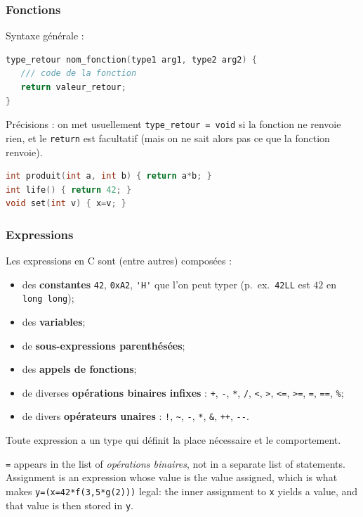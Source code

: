 \subsubsection{Fonctions}
Syntaxe générale :
\begin{lstlisting}[language=C]
type_retour nom_fonction(type1 arg1, type2 arg2) {
   /// code de la fonction
   return valeur_retour;
}
\end{lstlisting}
Précisions : on met usuellement \verb|type_retour = void| si la fonction ne
renvoie rien, et le \verb|return| est facultatif (mais on ne sait alors pas ce
que la fonction renvoie).

\begin{example}
  \begin{lstlisting}[language=C]
int produit(int a, int b) { return a*b; }
int life() { return 42; }
void set(int v) { x=v; }
  \end{lstlisting}
\end{example}

\subsubsection{Expressions}
Les expressions en C sont (entre autres) composées :
\begin{itemize}
  \item des \textbf{constantes} \verb|42|, \verb|0xA2|, \verb|'H'| que l'on
    peut typer (p.~ex.\ \verb|42LL| est $42$ en \verb|long long|);
  \item des \textbf{variables};
  \item de \textbf{sous-expressions parenthésées};
  \item des \textbf{appels de fonctions};
  \item de diverses \textbf{opérations binaires infixes} : \verb|+|, \verb|-|,
    \verb|*|, \verb|/|, \verb|<|, \verb|>|, \verb|<=|, \verb|>=|, \verb|=|,
    \verb|==|, \verb|%|;
  \item de divers \textbf{opérateurs unaires} : \verb|!|, \verb|~|, \verb|-|,
    \verb|*|, \verb|&|, \verb|++|, \verb|--|.
\end{itemize}
Toute expression a un type qui définit la place nécessaire et le comportement.

\begin{remark}
  \verb|=| appears in the list of \textit{opérations binaires}, not in a separate
  list of statements. Assignment is an expression whose value is the value
  assigned, which is what makes \verb|y=(x=42*f(3,5*g(2)))| legal: the inner
  assignment to \verb|x| yields a value, and that value is then stored in
  \verb|y|.
\end{remark}

